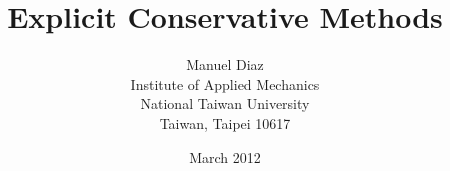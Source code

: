 \documentclass[a4paper]{article}
\begin{document}
\title{Explicit Conservative Methods}
\author{Manuel Diaz\\[1ex]
	Institute of Applied Mechanics\\
	National Taiwan University \\
	Taiwan, Taipei 10617
	}
\date{March 2012}
\maketitle

\tableofcontents












\end{document}
